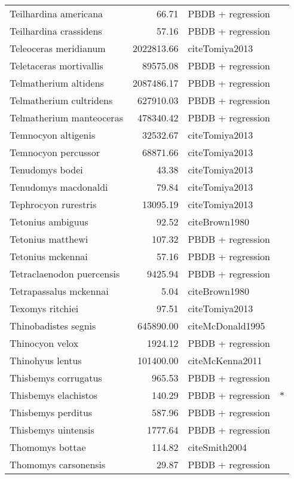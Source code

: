 \begin{table}[ht]
\begin{tabular}{lrll}
  Teilhardina americana & 66.71 & PBDB + regression &  \\ 
  Teilhardina crassidens & 57.16 & PBDB + regression &  \\ 
  Teleoceras meridianum & 2022813.66 & cite{Tomiya2013} &  \\ 
  Teletaceras mortivallis & 89575.08 & PBDB + regression &  \\ 
  Telmatherium altidens & 2087486.17 & PBDB + regression &  \\ 
  Telmatherium cultridens & 627910.03 & PBDB + regression &  \\ 
  Telmatherium manteoceras & 478340.42 & PBDB + regression &  \\ 
  Temnocyon altigenis & 32532.67 & cite{Tomiya2013} &  \\ 
  Temnocyon percussor & 68871.66 & cite{Tomiya2013} &  \\ 
  Tenudomys bodei & 43.38 & cite{Tomiya2013} &  \\ 
  Tenudomys macdonaldi & 79.84 & cite{Tomiya2013} &  \\ 
  Tephrocyon rurestris & 13095.19 & cite{Tomiya2013} &  \\ 
  Tetonius ambiguus & 92.52 & cite{Brown1980} &  \\ 
  Tetonius matthewi & 107.32 & PBDB + regression &  \\ 
  Tetonius mckennai & 57.16 & PBDB + regression &  \\ 
  Tetraclaenodon puercensis & 9425.94 & PBDB + regression &  \\ 
  Tetrapassalus mckennai & 5.04 & cite{Brown1980} &  \\ 
  Texomys ritchiei & 97.51 & cite{Tomiya2013} &  \\ 
  Thinobadistes segnis & 645890.00 & cite{McDonald1995} &  \\ 
  Thinocyon velox & 1924.12 & PBDB + regression &  \\ 
  Thinohyus lentus & 101400.00 & cite{McKenna2011} &  \\ 
  Thisbemys corrugatus & 965.53 & PBDB + regression &  \\ 
  Thisbemys elachistos & 140.29 & PBDB + regression & * \\ 
  Thisbemys perditus & 587.96 & PBDB + regression &  \\ 
  Thisbemys uintensis & 1777.64 & PBDB + regression &  \\ 
  Thomomys bottae & 114.82 & cite{Smith2004} &  \\ 
  Thomomys carsonensis & 29.87 & PBDB + regression &  \\ 

\end{tabular}
\end{table}
